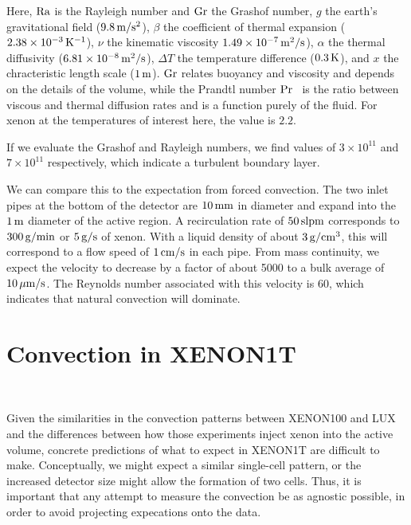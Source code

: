 Here, $\mathrm{Ra}$ is the Rayleigh number and $\mathrm{Gr}$ the Grashof number, $g$ the earth's gravitational field ($9.8\,\mathrm{m/s^2}$), $\beta$ the coefficient of thermal expansion ($2.38\times10^{-3}\,\mathrm{K^{-1}}$), $\nu$ the kinematic viscosity $1.49\times10^{-7}\,\mathrm{m^2/s}$), $\alpha$ the thermal diffusivity ($6.81\times10^{-8}\,\mathrm{m^2/s}$), $\Delta T$ the temperature difference ($0.3\,\mathrm{K}$), and $x$ the chracteristic length scale ($1\,\mathrm{m}$). $\mathrm{Gr}$ relates buoyancy and viscosity and depends on the details of the volume, while the Prandtl number $\mathrm{Pr}$~\cite{Prandtl} is the ratio between viscous and thermal diffusion rates and is a function purely of the fluid. For xenon at the temperatures of interest here, the value is $2.2$.

If we evaluate the Grashof and Rayleigh numbers, we find values of $3\times10^{11}$ and $7\times10^{11}$ respectively, which indicate a turbulent boundary layer.

We can compare this to the expectation from forced convection. The two inlet pipes at the bottom of the detector are $10\,\mathrm{mm}$ in diameter and expand into the $1\,\mathrm{m}$ diameter of the active region. A recirculation rate of $50\,\mathrm{slpm}$ corresponds to $300\,\mathrm{g/min}$ or $5\,\mathrm{g/s}$ of xenon. With a liquid density of about $3\,\mathrm{g/cm^3}$, this will correspond to a flow speed of $1\,\mathrm{cm/s}$ in each pipe. From mass continuity, we expect the velocity to decrease by a factor of about 5000 to a bulk average of $10\,\mathrm{\mu m/s}$. The Reynolds number associated with this velocity is $60$, which indicates that natural convection will dominate.

\section{Convection in XENON1T}~\label{sec:convection}

Given the similarities in the convection patterns between XENON100 and LUX and the differences between how those experiments inject xenon into the active volume, concrete predictions of what to expect in XENON1T are difficult to make. Conceptually, we might expect a similar single-cell pattern, or the increased detector size might allow the formation of two cells. Thus, it is important that any attempt to measure the convection be as agnostic possible, in order to avoid projecting expecations onto the data.

